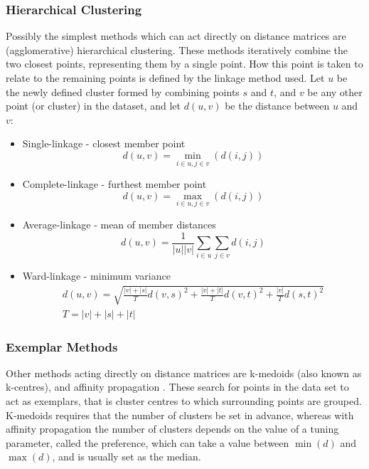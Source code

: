 \documentclass[11pt]{article}
\begin{document}
\subsubsection{Hierarchical Clustering}
Possibly the simplest methods which can act directly on distance matrices are (agglomerative) hierarchical clustering. These methods iteratively combine the two closest points, representing them by a single point. How this point is taken to relate to the remaining points is defined by the linkage method used. Let $u$ be the newly defined cluster formed by combining points $s$ and $t$, and $v$ be any other point (or cluster) in the dataset, and let $d(u,v)$ be the distance between $u$ and $v$:
\begin{itemize}
	\item Single-linkage - closest member point 
		\begin{equation*}
		d(u,v)=\min_{i \in u, j \in v} (d(i,j))
		\end{equation*}
\item Complete-linkage - furthest member point 
		\begin{equation*}
		d(u,v)=\max_{i \in u, j \in v} (d(i,j))
		\end{equation*}

	\item Average-linkage - mean of member distances
		\begin{equation*}
		d(u,v)=\frac{1}{\left|{u}\right|\left|{v}\right|}\sum_{i \in u}\sum_{j \in v} d(i,j)
		\end{equation*}

	\item Ward-linkage - minimum variance
		\begin{align*}
		d(u,v)=\sqrt{ \frac{\left|v\right| +  \left|s\right|}{T}d(v,s)^2 + \frac{\left|v\right| +  \left|t\right|}{T}d(v,t)^2 + \frac{\left|v\right|}{T}d(s,t)^2} \\
		T=\left|v\right| +  \left|s\right| + \left|t\right|
		\end{align*}
	
\end{itemize}


\subsubsection{Exemplar Methods}
Other methods acting directly on distance matrices are k-medoids (also known as k-centres), and affinity propagation \citep{Frey:2007hs}. These search for points in the data set to act as exemplars, that is cluster centres to which surrounding points are grouped. K-medoids requires that the number of clusters be set in advance, whereas with affinity propagation the number of clusters depends on the value of a tuning parameter, called the preference, which can take a value between $\min(d)$ and $\max(d)$, and is usually set as the median.
\end{document}
